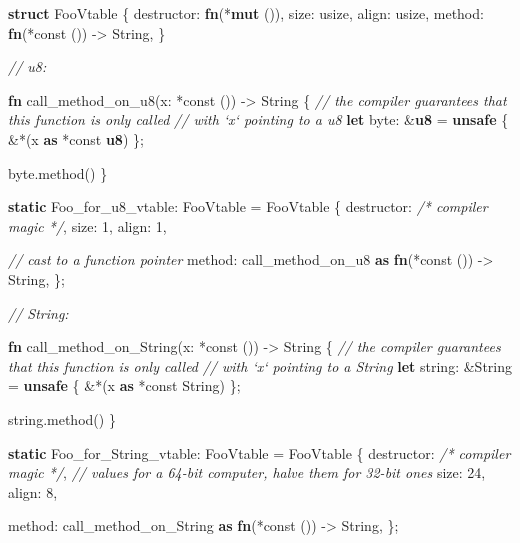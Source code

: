 \documentclass[a4paper,]{book}
\newenvironment{Shaded}{\begin{snugshade}}{\end{snugshade}}
\newcommand{\KeywordTok}[1]{\textcolor[rgb]{0.13,0.29,0.53}{\textbf{{#1}}}}
\newcommand{\DecValTok}[1]{\textcolor[rgb]{0.00,0.00,0.81}{{#1}}}
\newcommand{\CommentTok}[1]{\textcolor[rgb]{0.56,0.35,0.01}{\textit{{#1}}}}
\newcommand{\NormalTok}[1]{{#1}}
\begin{document}
\begin{Shaded}
\begin{Highlighting}[]
\KeywordTok{struct} \NormalTok{FooVtable \{}
    \NormalTok{destructor: }\KeywordTok{fn}\NormalTok{(*}\KeywordTok{mut} \NormalTok{()),}
    \NormalTok{size: usize,}
    \NormalTok{align: usize,}
    \NormalTok{method: }\KeywordTok{fn}\NormalTok{(*const ()) -> String,}
\NormalTok{\}}

\CommentTok{// u8:}

\KeywordTok{fn} \NormalTok{call_method_on_u8(x: *const ()) -> String \{}
    \CommentTok{// the compiler guarantees that this function is only called}
    \CommentTok{// with `x` pointing to a u8}
    \KeywordTok{let} \NormalTok{byte: &}\KeywordTok{u8} \NormalTok{= }\KeywordTok{unsafe} \NormalTok{\{ &*(x }\KeywordTok{as} \NormalTok{*const }\KeywordTok{u8}\NormalTok{) \};}

    \NormalTok{byte.method()}
\NormalTok{\}}

\KeywordTok{static} \NormalTok{Foo_for_u8_vtable: FooVtable = FooVtable \{}
    \NormalTok{destructor: }\CommentTok{/* compiler magic */}\NormalTok{,}
    \NormalTok{size: }\DecValTok{1}\NormalTok{,}
    \NormalTok{align: }\DecValTok{1}\NormalTok{,}

    \CommentTok{// cast to a function pointer}
    \NormalTok{method: call_method_on_u8 }\KeywordTok{as} \KeywordTok{fn}\NormalTok{(*const ()) -> String,}
\NormalTok{\};}


\CommentTok{// String:}

\KeywordTok{fn} \NormalTok{call_method_on_String(x: *const ()) -> String \{}
    \CommentTok{// the compiler guarantees that this function is only called}
    \CommentTok{// with `x` pointing to a String}
    \KeywordTok{let} \NormalTok{string: &String = }\KeywordTok{unsafe} \NormalTok{\{ &*(x }\KeywordTok{as} \NormalTok{*const String) \};}

    \NormalTok{string.method()}
\NormalTok{\}}

\KeywordTok{static} \NormalTok{Foo_for_String_vtable: FooVtable = FooVtable \{}
    \NormalTok{destructor: }\CommentTok{/* compiler magic */}\NormalTok{,}
    \CommentTok{// values for a 64-bit computer, halve them for 32-bit ones}
    \NormalTok{size: }\DecValTok{24}\NormalTok{,}
    \NormalTok{align: }\DecValTok{8}\NormalTok{,}

    \NormalTok{method: call_method_on_String }\KeywordTok{as} \KeywordTok{fn}\NormalTok{(*const ()) -> String,}
\NormalTok{\};}
\end{Highlighting}
\end{Shaded}
\end{document}
